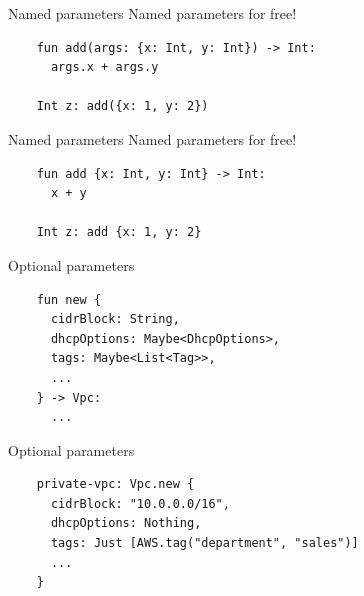 \documentclass[aspectratio=169,20pt]{beamer}
\newcommand{\vspaced}{
    \vspace{5mm}
}
\begin{document}
\begin{frame}[fragile]{Named parameters}
    Named parameters for free! \\
    \vspaced
    \begin{lstlisting}
    fun add(args: {x: Int, y: Int}) -> Int:
      args.x + args.y

    Int z: add({x: 1, y: 2})
    \end{lstlisting}
\end{frame}

\begin{frame}[fragile]{Named parameters}
    Named parameters for free! \\
    \vspaced
    \begin{lstlisting}
    fun add {x: Int, y: Int} -> Int:
      x + y

    Int z: add {x: 1, y: 2}
    \end{lstlisting}
\end{frame}

\begin{frame}[fragile]{Optional parameters}
    \begin{lstlisting}
    fun new {
      cidrBlock: String,
      dhcpOptions: Maybe<DhcpOptions>,
      tags: Maybe<List<Tag>>,
      ...
    } -> Vpc:
      ...
    \end{lstlisting}
\end{frame}

\begin{frame}[fragile]{Optional parameters}
    \begin{lstlisting}
    private-vpc: Vpc.new {
      cidrBlock: "10.0.0.0/16",
      dhcpOptions: Nothing,
      tags: Just [AWS.tag("department", "sales")]
      ...
    }
    \end{lstlisting}
\end{frame}
\end{document}
